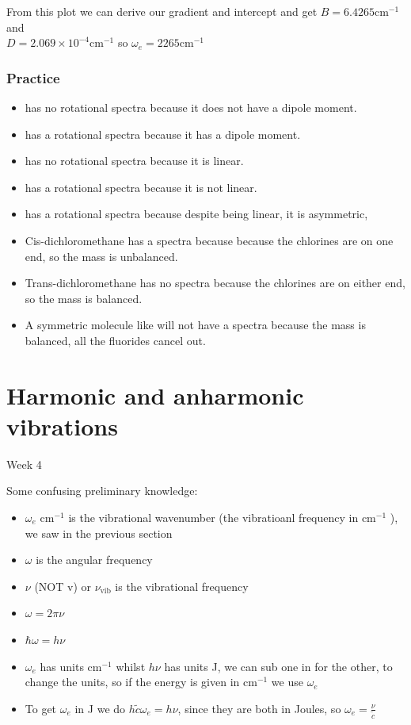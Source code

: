 \documentclass{article}
\newcommand{\thedate}[1]{\hfill{\small\sc #1}}
\newcommand{\cm}{cm\(^{-1}\) }
\begin{document}
    From this plot we can derive our gradient and intercept and get $B = 6.4265 \text{cm}^{-1}$ and \\$D=2.069 \times 10^{-4} \text{cm}^{-1}$
    so $\omega_e = 2265 \text{cm} ^{-1}$

    \subsubsection{Practice}
    \begin{itemize}
        \item {} has no rotational spectra because it does not have a dipole moment.
        \item {} has a rotational spectra because it has a dipole moment.
        \item {} has no rotational spectra because it is linear.
        \item {} has a rotational spectra because it is not linear.
        \item {} has a rotational spectra because despite being linear, it is asymmetric, 
        \item Cis-dichloromethane has a spectra because because the chlorines are on one end, so the mass is unbalanced.
        \item Trans-dichloromethane has no spectra because the chlorines are on either end, so the mass is balanced. 
        \item A symmetric molecule like  will not have a spectra because the mass is balanced, all the fluorides cancel out.
    \end{itemize}
    
    \section{Harmonic and anharmonic vibrations}\thedate{Week 4}

    Some confusing preliminary knowledge:
    \begin{itemize}
        \item $\omega_e$ \cm is the vibrational wavenumber (the vibratioanl frequency in \cm), we saw in the previous section
        \item $\omega$ is the angular frequency
        \item $\nu$ (NOT v) or $\nu_\text{vib}$ is the vibrational frequency
        \item $\omega = 2\pi \nu$
        \item $\hbar \omega = h \nu$
        \item $\omega_e$ has units \cm whilst $h\nu$ has units J, we can sub one in for the other, to change 
        the units, so if the energy is given in \cm we use $\omega_e$
        \item To get $\omega_e$ in J we do $h\tilde{c}\omega_e = h\nu$, since they are both in Joules, so $\omega_e = \frac{\nu}{\tilde{c}}$
    \end{itemize}
\end{document}
